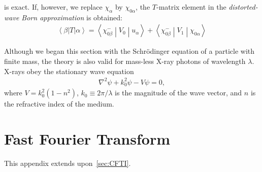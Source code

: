 \documentclass[10pt,twoside, b5paper,pdftex]{report}
\newcommand{\bra}[1]{\ensuremath{\left\langle#1\right|}}
\newcommand{\ket}[1]{\ensuremath{\left|#1\right\rangle}}
\newcommand{\matrixel}[3]{\ensuremath{\left\langle #1 \middle| #2 \middle| #3 \right\rangle}}
\begin{document}
 is exact. If, however, we replace $\chi_{\alpha}$ by $\chi_{0\alpha}$, the $T$-matrix element in the {\it distorted-wave Born approximation} is obtained:
\begin{align}
  \boxed{\bra{\beta}T\ket{\alpha} = \matrixel{\chi_{0\beta}^{-}}{V_{0}}{u_{\alpha}} + \matrixel{\chi_{0\beta}^{-}}{V_{1}}{\chi_{0\alpha}}} \label{eq:dwba_core}
\end{align}

Although we began this section with the Schrödinger equation of a particle with finite mass, the theory is also valid for mass-less X-ray photons of wavelength $\lambda$. X-rays obey the stationary wave equation~\cite{SINHA}
\begin{align}
    \nabla^{2}\psi + k_0^2\psi - V\psi = 0,
\end{align}
where  $V = k_0^2(1 - n^2)$, $k_0 \equiv 2\pi/\lambda$ is the magnitude of the wave vector, and $n$ is the refractive index of the medium.











 
\chapter{Fast Fourier Transform \label{appn:fft}}
This appendix extends upon~\cref{sec:CFTI}. 
\end{document}
